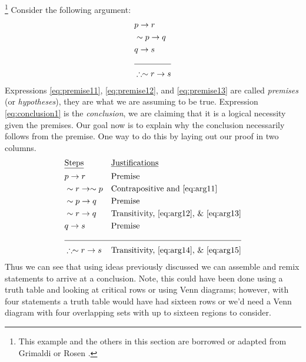 

\begin{exposition}
    \footnote{This example and the others in this section are borrowed or adapted from Grimaldi \cite{grimaldi1994discrete} or Rosen \cite{rosen2006discrete}.}
    Consider the following argument:
    \begin{align}
        &p\rightarrow r \label{eq:premise11}\\
        &\sim p\rightarrow q\label{eq:premise12}\\
        &q\rightarrow s\label{eq:premise13}\\ \cline{1-2}
        &\therefore \sim r\rightarrow s\label{eq:conclusion1}
    \end{align}
    Expressions \ref{eq:premise11}, \ref{eq:premise12}, and \ref{eq:premise13} are called \emph{premises} (or \emph{hypotheses}), they are what we are assuming to be true.  Expression \ref{eq:conclusion1} is the \emph{conclusion}, we are claiming that it is a logical necessity given the premises.  Our goal now is to explain why the conclusion necessarily follows from the premise.  One way to do this by laying out our proof in two columns.
    \begin{align}
        &\text{\underline{Steps}} &&\text{\underline{Justifications}}\nonumber\\
        &p\rightarrow r && \text{Premise}\label{eq:arg11}\\
        &\sim r\rightarrow \sim p && \text{Contrapositive and \ref{eq:arg11}} \label{eq:arg12}\\
        &\sim p \rightarrow q && \text{Premise}\label{eq:arg13}\\
        &\sim r \rightarrow q && \text{Transitivity, \ref{eq:arg12}, \& \ref{eq:arg13}}\label{eq:arg14}\\
        &q \rightarrow s && \text{Premise}\label{eq:arg15}\\ \cline{1-4}
        &\therefore \sim r \rightarrow s && \text{Transitivity, \ref{eq:arg14}, \& \ref{eq:arg15}}\label{eq:arg16}
    \end{align}
    Thus we can see that using ideas previously discussed we can assemble and remix statements to arrive at a conclusion.  Note, this could have been done using a truth table and looking at critical rows or using Venn diagrams; however, with four statements a truth table would have had sixteen rows or we'd need a Venn diagram with four overlapping sets with up to sixteen regions to consider.
\end{exposition}

